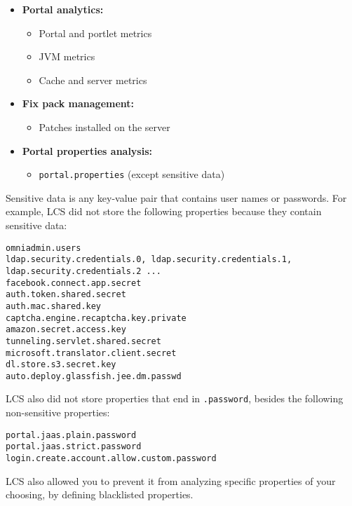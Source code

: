 \begin{itemize}
\item
  \textbf{Portal analytics:}

  \begin{itemize}
  \tightlist
  \item
    Portal and portlet metrics
  \item
    JVM metrics
  \item
    Cache and server metrics
  \end{itemize}
\item
  \textbf{Fix pack management:}

  \begin{itemize}
  \tightlist
  \item
    Patches installed on the server
  \end{itemize}
\item
  \textbf{Portal properties analysis:}

  \begin{itemize}
  \tightlist
  \item
    \texttt{portal.properties} (except sensitive data)
  \end{itemize}
\end{itemize}

Sensitive data is any key-value pair that contains user names or
passwords. For example, LCS did not store the following properties
because they contain sensitive data:

\begin{verbatim}
omniadmin.users
ldap.security.credentials.0, ldap.security.credentials.1, ldap.security.credentials.2 ...
facebook.connect.app.secret
auth.token.shared.secret
auth.mac.shared.key
captcha.engine.recaptcha.key.private
amazon.secret.access.key
tunneling.servlet.shared.secret
microsoft.translator.client.secret
dl.store.s3.secret.key
auto.deploy.glassfish.jee.dm.passwd
\end{verbatim}

LCS also did not store properties that end in \texttt{.password},
besides the following non-sensitive properties:

\begin{verbatim}
portal.jaas.plain.password
portal.jaas.strict.password
login.create.account.allow.custom.password
\end{verbatim}

LCS also allowed you to prevent it from analyzing specific properties of
your choosing, by defining blacklisted properties.

